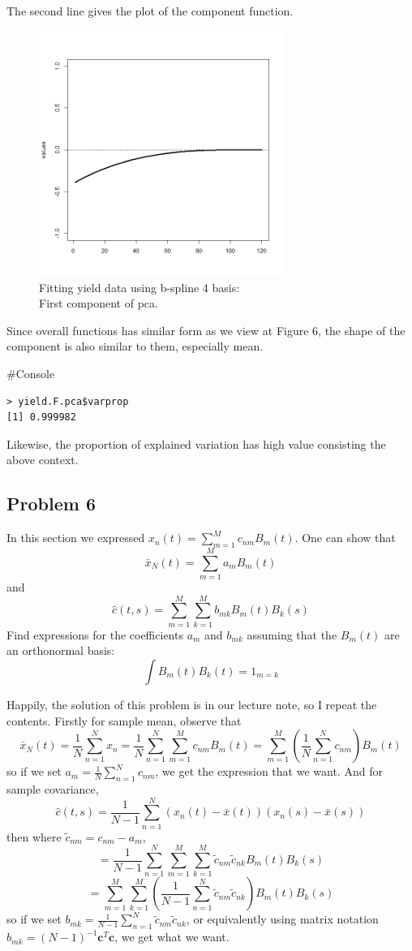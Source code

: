 \documentclass{article}
\newenvironment{console}%
{%
    \begin{mdframed}
    \#Console
    \begin{small}
}
{%
    \end{small}
    \end{mdframed}
}
\begin{document}
The second line gives the plot of the component function.
\begin{figure}[hh]
    \centering
    \includegraphics[height=8cm]{yield_bspline4fit_pca_1comp.png}
    \caption{Fitting yield data using b-spline 4 basis:\\ First component of pca.}
\end{figure}

Since overall functions has similar form as we view at Figure 6, the shape of the component is also similar to them, especially mean.

\begin{console}
    \begin{verbatim}
> yield.F.pca$varprop
[1] 0.999982
    \end{verbatim}
\end{console}

Likewise, the proportion of explained variation has high value consisting the above context.

\newpage
\subsection{Problem 6}
In this section we expressed \(x_n(t)=\sum_{m=1}^{M}c_{nm}B_m(t)\). One can show that
\[\bar{x}_N(t)=\sum_{m=1}^{M}a_mB_m(t) \]
and
\[\hat{c}(t,s)=\sum_{m=1}^{M}\sum_{k=1}^Mb_{mk}B_m(t)B_k(s)\]
Find expressions for the coefficients $a_m$ and $b_{mk}$ assuming that the
$B_m(t)$ are an orthonormal basis:
\[\int B_m(t)B_k(t)=1_{m=k}\]
%

Happily, the solution of this problem is in our lecture note, so I repeat the contents.
Firstly for sample mean, observe that
\[\bar{x}_N(t)=\frac{1}{N}\sum_{n=1}^{N}x_n=\frac{1}{N}\sum_{n=1}^{N}\sum_{m=1}^{M}c_{nm}B_m(t)=\sum_{m=1}^{M}(\frac{1}{N}\sum_{n=1}^{N}c_{nm})B_m(t)\]
so if we set \(a_m=\frac{1}{N}\sum_{n=1}^{N}c_{nm}\), we get the expression that we want.
And for sample covariance,
\[\hat{c}(t,s)=\frac{1}{N-1}\sum_{n=1}^{N}(x_n(t)-\bar{x}(t))(x_n(s)-\bar{x}(s))\]
then where \(\tilde{c}_{nm}=c_{nm}-a_m\),
\[=\frac{1}{N-1}\sum_{n=1}^{N}\sum_{m=1}^{M}\sum_{k=1}^{M}\tilde{c}_{nm}\tilde{{c}}_{nk}B_{m}(t)B_{k}(s)\]
\[=\sum_{m=1}^{M}\sum_{k=1}^{M}(\frac{1}{N-1}\sum_{n=1}^{N}\tilde{c}_{nm}\tilde{{c}}_{nk})B_{m}(t)B_{k}(s)\]
so if we set \(b_{mk}=\frac{1}{N-1}\sum_{n=1}^{N}\tilde{c}_{nm}\tilde{{c}}_{nk}\), 
or equivalently using matrix notation \(b_{mk}=(N-1)^{-1}\mathbf{c}^T\mathbf{c}\), we get what we want.
\end{document}
